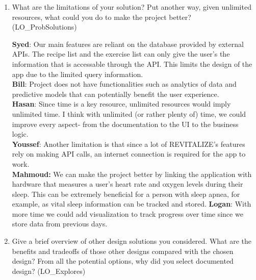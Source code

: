 \documentclass[12pt, titlepage]{article}
\begin{document}
	\begin{enumerate}
		\item What are the limitations of your solution?  Put another way, given
		unlimited resources, what could you do to make the project better? (LO\_ProbSolutions)
		
		\textbf{Syed}: Our main features are reliant on the database provided by external APIs. The recipe list and the exercise list can only give the user's the information that is accessable through the API. This limits the design of the app due to the limited query information. \\
		\textbf{Bill}: Project does not have functionalities such as analytics of data and predictive models that can potentially benefit the user experience. \\
		\textbf{Hasan}: Since time is a key resource, unlimited resources would imply unlimited time. I think with unlimited (or rather plenty of) time, we could improve every aspect- from the documentation to the UI to the business logic. \\
		\textbf{Youssef}: Another limitation is that since a lot of REVITALIZE's features rely on making API calls, an internet connection is required for the app to work. \\
		\textbf{Mahmoud:} We can make the project better by linking the application with hardware that measures a user's heart rate and oxygen levels during their sleep. This can be extremely beneficial for a person with sleep apnea, for example, as vital sleep information can be tracked and stored.
    \textbf{Logan}: With more time we could add visualization to track progress over time since we store data from previous days.
		
		
		\item Give a brief overview of other design solutions you considered.  What
		are the benefits and tradeoffs of those other designs compared with the chosen
		design?  From all the potential options, why did you select documented design?
		(LO\_Explores)
		

\end{enumerate}
\end{document}
